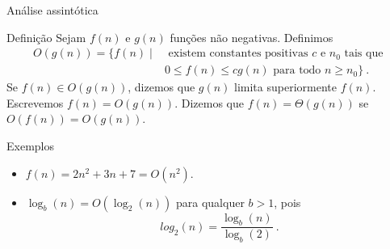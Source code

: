 \begin{frame}{Análise assintótica}

    \begin{block}{Definição}
        Sejam $f(n)$ e $g(n)$ funções não negativas. Definimos
        \begin{align*}
            O(g(n)) = \{ f(n) \mid &\text{ existem constantes positivas } c \text{ e } n_0 \text{ tais que } \\
            &  0 \leq f(n) \leq cg(n)  \text{ para todo } n \geq n_0 \} \ . 
        \end{align*} \pause
        Se $f(n) \in O(g(n))$, dizemos que $g(n)$ limita superiormente $f(n)$. Escrevemos $f(n) = O(g(n))$. \pause Dizemos que $f(n) = \Theta(g(n))$ se $O(f(n)) = O(g(n))$.
    \end{block} \pause

    \begin{block}{Exemplos}
        \begin{itemize}
            \item[(i)] $f(n) = 2n^2 + 3n + 7 = O(n^2)$. \pause
            
            \item[(ii)] $\log_b(n) = O(\log_2(n))$ para qualquer $b > 1$, pois
                \[ log_2(n) = \frac{\log_b(n)}{\log_b(2)} \ . \]
        \end{itemize}
        
    \end{block}

\end{frame}

